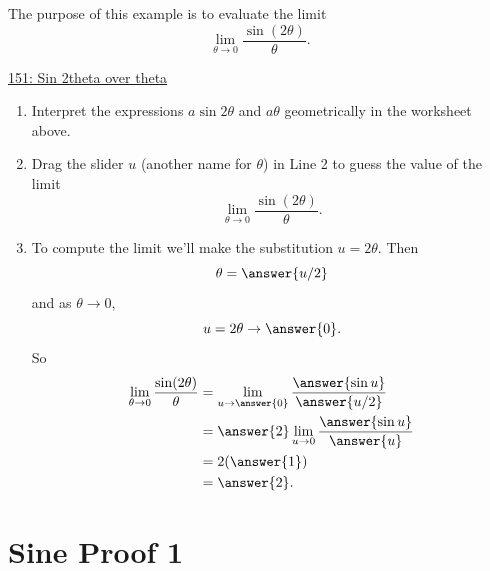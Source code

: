 \documentclass{ximera}
\begin{document}
\begin{example}  \label{Exgzmq}
The purpose of this example is to evaluate the limit
\[
  \lim_{\theta\to 0} \frac{\sin (2\theta)}{\theta}.
\]

\begin{onlineOnly}
    \begin{center}
\end{center}
\end{onlineOnly}

\href{https://www.desmos.com/calculator/u1czzdozr7}{151: Sin 2theta over theta}

\begin{enumerate}
\item Interpret the expressions $a \sin 2\theta$ and $a \theta$ geometrically in the worksheet above.
\begin{freeResponse}
\end{freeResponse}

\item Drag the slider $u$ (another name for $\theta$) in Line 2 to guess the value of the limit
\[
   \lim_{\theta\to 0} \frac{\sin (2\theta)}{\theta}.
\]
\begin{freeResponse}
\end{freeResponse}

\item To compute the limit we'll make the substitution $u = 2\theta$. Then
\[
   \theta = \answer{u/2}
\]
and as $\theta\to 0$, 
\[
  u = 2\theta \to \answer{0}.
\]
So
\begin{align*}
\lim_{\theta\to 0} \frac{\sin (2\theta)}{\theta} &= \lim_{u\to \answer{0}} \frac{\answer{\sin u}}{\answer{u/2}} \\
                               &= \answer{2} \lim_{u \to 0} \frac{\answer{\sin u}}{\answer{u}} \\
                               &= 2 (\answer{1}) \\
                               &= \answer{2} .
\end{align*}

\end{enumerate}
\end{example}

\section{Sine Proof 1}
\end{document}
